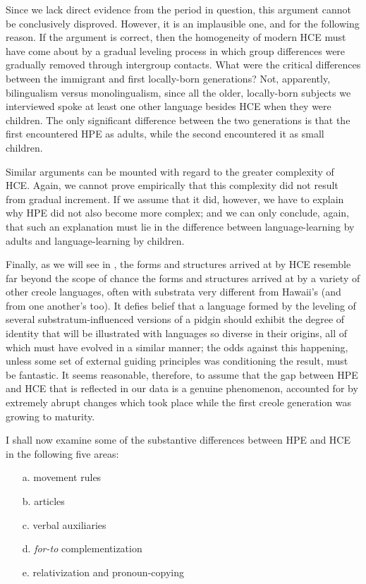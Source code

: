 Since we lack direct evidence from the period in question, this argument cannot be conclusively disproved. However, it is an im\-plausible one, and for the following reason. If the argument is correct, then the homogeneity of modern HCE must have come about by a gradual leveling process in which group differences were gradually removed through intergroup contacts. What were the critical differ\-ences between the immigrant and first locally-born generations? Not, apparently, bilingualism versus monolingualism, since all the older, locally-born subjects we interviewed spoke at least one other language besides HCE when they were children. The only significant difference between the two generations is that the first encountered HPE as adults, while the second encountered it as small children.

Similar arguments can be mounted with regard to the greater complexity of HCE. Again, we cannot prove empirically that this complexity did not result from gradual increment. If we assume that it did, however, we have to explain why HPE did not also become more complex; and we can only conclude, again, that such an explanation must lie in the difference between language-learning by adults and language-learning by children.

Finally, as we will see in , the forms and structures arrived at by HCE resemble far beyond the scope of chance the forms
and structures arrived at by a variety of other creole languages, often with substrata very different from Hawaii's (and from one another's too). It defies belief that a language formed by the leveling of several substratum-influenced versions of a pidgin should exhibit the degree of identity that will be illustrated with languages so diverse in their origins, all of which must have evolved in a similar manner; the odds against this happening, unless some set of external guiding principles was condi\-tioning the result, must be fantastic. It seems reasonable, therefore, to assume that the gap between HPE and HCE that is reflected in our data is a genuine phenomenon, accounted for by extremely abrupt changes which took place while the first creole generation was growing to maturity.

I shall now examine some of the substantive differences between HPE and HCE in the following five areas:

\begin{enumerate}
\item[a.] movement rules
\item[b.] articles
\item[c.] verbal auxiliaries
\item[d.] \textit{for-to} complementization
\item[e.] relativization and pronoun-copying
\end{enumerate}
 

